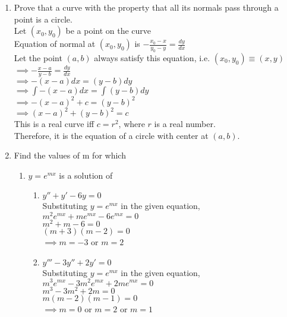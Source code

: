 \documentclass[a4paper]{article}
\begin{document}
\begin{enumerate}
\item{Prove that a curve with the property that all its normals pass through a point is a circle.
\\Let $(x_0, y_0)$ be a point on the curve
\\Equation of normal at $(x_0, y_0)$ is $-\frac{x_0-x}{y_0-y}=\frac{dy}{dx}$
\\Let the point $(a, b)$ always satisfy this equation, i.e. $(x_0, y_0) \equiv (x, y)$
\\$\implies -\frac{x-a}{y-b}=\frac{dy}{dx}$
\\$\implies -(x-a)dx = (y-b)dy$
\\$\implies \int -(x-a)dx = \int (y-b)dy$
\\$\implies -(x-a)^2 + c = (y-b)^2 $
\\$\implies (x-a)^2 + (y-b)^2 =c $
\\This is a real curve iff $c=r^2$, where $r$ is a real number.
\\Therefore, it is the equation of a circle with center at $(a, b)$.
}
\renewcommand{\labelenumii}{(\alph{enumii})}
\item{Find the values of m for which
\begin{enumerate}
\item{$y=e^{mx}$ is a solution of
\begin{enumerate}
\item{$y'' +y'-6y=0$
\\Substituting $y=e^{mx}$ in the given equation,
\\$m^2e^{mx}+me^{mx}-6e^{mx}=0$
\\$m^2+m-6=0$
\\$(m+3)(m-2)=0$
\\$\implies m=-3$ or $m=2$
}
\item{$y'''-3y''+2y'=0$
\\Substituting $y=e^{mx}$ in the given equation,
\\$m^3e^{mx}-3m^2e^{mx}+2me^{mx}=0$
\\$m^3-3m^2+2m=0$
\\$m(m-2)(m-1)=0$
\\$\implies m=0$ or $m=2$ or $m=1$
}

\end{enumerate}
}


\end{enumerate}}
\end{enumerate}
\end{document}

